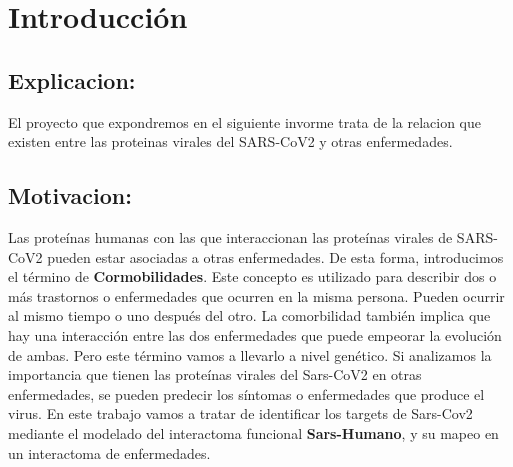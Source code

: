 \newpage
\section{Introducción}
    
    \subsection{Explicacion:}
    
        El proyecto que expondremos en el siguiente invorme trata de la relacion que existen entre las proteinas virales del SARS-CoV2 y otras enfermedades.
        
    \subsection{Motivacion:}
    
        Las proteínas humanas con las que interaccionan las proteínas virales de SARS-CoV2 pueden estar asociadas a otras enfermedades. De esta forma, introducimos el término de \textbf{Cormobilidades}. Este concepto es utilizado para describir dos o más trastornos o enfermedades que ocurren en la misma persona. Pueden ocurrir al mismo tiempo o uno después del otro. La comorbilidad también implica que hay una interacción entre las dos enfermedades que puede empeorar la evolución de ambas. Pero este término vamos a llevarlo a nivel genético. Si analizamos la importancia que tienen las proteínas virales del Sars-CoV2 en otras enfermedades, se pueden predecir los síntomas o enfermedades que produce el virus. En este trabajo vamos a tratar de identificar los targets de Sars-Cov2 mediante el modelado del interactoma funcional \textbf{Sars-Humano}, y su mapeo en un interactoma de enfermedades.


